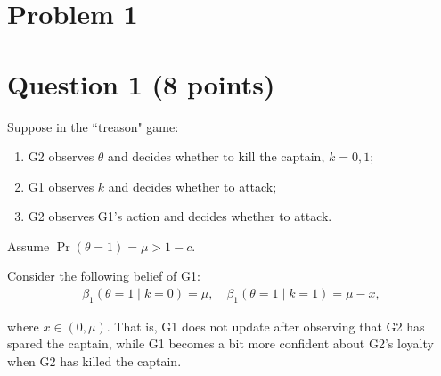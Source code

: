 \documentclass[11pt]{article}
\begin{document}
	
	
	\psetheader
\section*{Problem 1}

\section*{Question 1 (8 points)}

Suppose in the ``treason" game:
\begin{enumerate}
    \item G2 observes $\theta$ and decides whether to kill the captain, $k = 0, 1$;
    \item G1 observes $k$ and decides whether to attack;
    \item G2 observes G1’s action and decides whether to attack.
\end{enumerate}

Assume $\Pr(\theta = 1) = \mu > 1 - c$.

Consider the following belief of G1:
\begin{align}
    \beta_1(\theta = 1 \mid k = 0) = \mu, \quad
\beta_1(\theta = 1 \mid k = 1) = \mu - x,
\end{align}

where $x \in (0, \mu)$. That is, G1 does not update after observing that G2 has spared the captain, while G1 becomes a bit more confident about G2’s loyalty when G2 has killed the captain.
\end{document}
